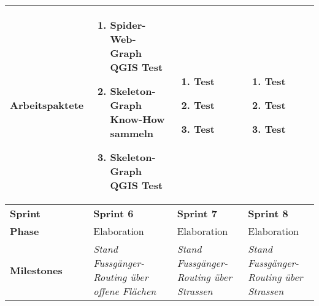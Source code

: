 \begin{landscape}
\begin{longtable}{l p{5.5cm} p{5.5cm} p{5.5cm}}
        \textbf{Arbeitspaktete}
                                & \begin{enumerate}[noitemsep]
                                    \item Spider-Web-Graph QGIS Test
                                    \item Skeleton-Graph Know-How sammeln
                                    \item Skeleton-Graph QGIS Test
                                \end{enumerate}
                                & \begin{enumerate}[noitemsep]
                                    \item Test
                                    \item Test
                                    \item Test
                                \end{enumerate}
                                & \begin{enumerate}[noitemsep]
                                    \item Test
                                    \item Test
                                    \item Test
                                \end{enumerate}  \\
        
        
        \toprule
        \textbf{Sprint}
                                & \textbf{Sprint 6}
                                & \textbf{Sprint 7}
                                & \textbf{Sprint 8} \\
        
        \midrule
        \textbf{Phase}
                                & Elaboration
                                & Elaboration
                                & Elaboration \\
        
        \textbf{Milestones}
                                & \textit{Stand Fussgänger-Routing über offene Flächen}
                                & \textit{Stand Fussgänger-Routing über Strassen}
                                & \textit{Stand Fussgänger-Routing über Strassen}  \\
        

\end{longtable}
\end{landscape}
